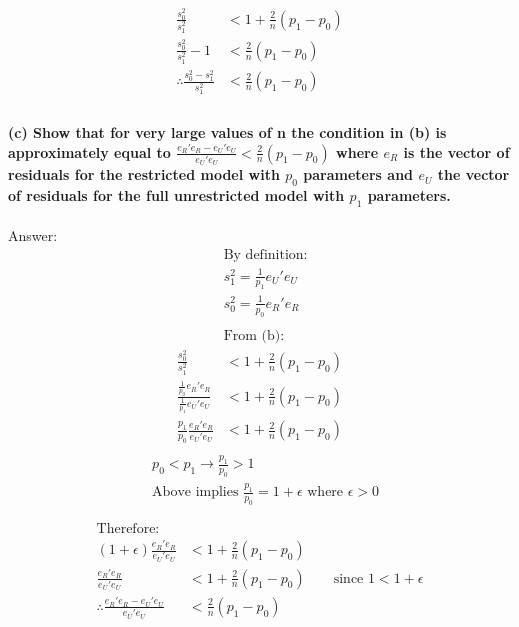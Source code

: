 \documentclass[12pt, a4paper]{article}
\begin{document}
\begin{align*}
    \frac{s_0^2}{s_1^2} &< 1 + \frac{2}{n}(p_1 - p_0)\\
    \frac{s_0^2}{s_1^2} -1 &< \frac{2}{n}(p_1 - p_0)\\
    \therefore\frac{s_0^2-s_1^2}{s_1^2} &< \frac{2}{n}(p_1 - p_0)\\
\end{align*}
\vspace{40em}\\
\textbf{(c) Show that for very large values of n the condition in (b) is approximately equal to $\frac{e_R'e_R - e_U'e_U}{e_U'e_U} < \frac{2}{n}(p_1 - p_0)$ where $e_R$ is the vector of residuals for the restricted model with $p_0$ parameters and $e_U$ the vector of residuals for the full unrestricted model with $p_1$ parameters.}\\\\
Answer:
\begin{align*}
    &\text{By definition:}\\
    &s_1^2 = \frac{1}{p_1}e_U'e_U\\
    &s_0^2 = \frac{1}{p_0}e_R'e_R\\\\
    &\text{From (b):}
\end{align*}
\begin{align*}
    \frac{s_0^2}{s_1^2} &< 1 + \frac{2}{n}(p_1 - p_0)\\
    \frac{\frac{1}{p_0}e_R'e_R}{\frac{1}{p_1}e_U'e_U}&< 1 + \frac{2}{n}(p_1 - p_0)\\
    \frac{p_1}{p_0}\frac{e_R'e_R}{e_U'e_U}&< 1 + \frac{2}{n}(p_1 - p_0)\\
\end{align*}
\begin{align*}
    &p_0 < p_1 \rightarrow \frac{p_1}{p_0} > 1\\
    &\text{Above implies } \frac{p_1}{p_0} = 1 + \epsilon \text{ where }\epsilon>0\\\\
\end{align*}
\begin{align*}
    \text{Therefore: }\\
    (1+\epsilon)\frac{e_R'e_R}{e_U'e_U}  &< 1 + \frac{2}{n}(p_1 - p_0)\\
    \frac{e_R'e_R}{e_U'e_U}  &< 1 + \frac{2}{n}(p_1 - p_0)\qquad \text{since } 1 < 1+\epsilon\\
    \therefore\frac{e_R'e_R - e_U'e_U}{e_U'e_U} &<\frac{2}{n}(p_1 - p_0)
\end{align*}
\end{document}
